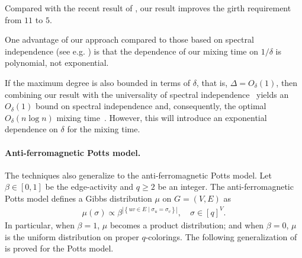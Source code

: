 \documentclass[a4paper,12pt]{article}
\theoremstyle{plain}
\theoremstyle{definition}
\newcommand{\set}[1]{\left\{#1\right\}}
\newcommand{\abs}[1]{\left\vert#1\right\vert}
\begin{document}
Compared with the recent result of \cite{JMV2026}, our result improves the girth requirement from $11$ to $5$.
\begin{remark}
One advantage of our approach compared to those based on spectral independence (see e.g. \cite{CLMM2023}) is that the dependence of our mixing time on $1/\delta$ is polynomial, not exponential.

If the maximum degree is also bounded in terms of $\delta$, that is,
$\Delta=O_\delta(1)$, then combining our result with the universality of
spectral independence~\cite{AnariEtAl2024} yields an $O_\delta(1)$ bound on
spectral independence and, consequently, the optimal $O_\delta(n\log n)$
mixing time~\cite{ChenLiuVigoda2021}.
However, this will introduce an exponential dependence on $\delta$ for the mixing time.
\end{remark}

\paragraph{Anti-ferromagnetic Potts model.}
The techniques also generalize to the anti-ferromagnetic Potts model.
Let $\beta \in [0,1]$ be the edge-activity and $q \geq 2$ be an integer.
The anti-ferromagnetic Potts model defines a Gibbs distribution $\mu$ on $G = (V,E)$ as
\begin{align*}
  \mu(\sigma) \propto \beta^{\abs{\set{uv\in E \mid \sigma_u = \sigma_v}}}, \quad \sigma \in [q]^V.
\end{align*}
In particular, when $\beta = 1$, $\mu$ becomes a product distribution; and when $\beta = 0$, $\mu$ is the uniform distribution on proper $q$-colorings.
The following generalization of  is proved for the Potts model.
\end{document}
